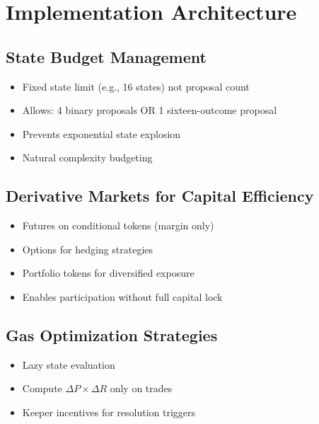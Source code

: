 \documentclass{article}
\begin{document}
\section{Implementation Architecture}
\subsection{State Budget Management}
\begin{itemize}
    \item Fixed state limit (e.g., 16 states) not proposal count
    \item Allows: 4 binary proposals OR 1 sixteen-outcome proposal
    \item Prevents exponential state explosion
    \item Natural complexity budgeting
\end{itemize}

\subsection{Derivative Markets for Capital Efficiency}
\begin{itemize}
    \item Futures on conditional tokens (margin only)
    \item Options for hedging strategies
    \item Portfolio tokens for diversified exposure
    \item Enables participation without full capital lock
\end{itemize}

\subsection{Gas Optimization Strategies}
\begin{itemize}
    \item Lazy state evaluation
    \item Compute $\Delta P \times \Delta R$ only on trades
    \item Keeper incentives for resolution triggers
\end{itemize}



\end{document}
